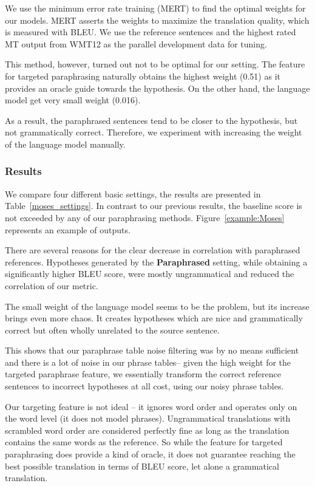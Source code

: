 \documentclass[11pt]{article}
\def\Tref#1{Table~\ref{#1}}
\def\Fref#1{Figure~\ref{#1}}
\begin{document}
We use the minimum error rate training (MERT) \cite{mert} to find the optimal 
weights for our models. MERT asserts the weights to maximize the translation 
quality, which is measured with BLEU. We use the reference sentences and the 
highest rated MT output from WMT12 as the parallel development data for tuning. 

This method, however, turned out not to be optimal for our setting. The feature 
for targeted paraphrasing naturally obtains the highest weight (0.51) as it 
provides an oracle guide towards the hypothesis. On the other hand, the language 
model get very small weight (0.016).

As a result, the paraphrased sentences tend to be closer to the hypothesis, but 
not grammatically correct. Therefore, we experiment with increasing the weight 
of the language model manually. 

\subsubsection{Results}
We compare four different basic settings, the results are presented in 
\Tref{moses_settings}. In contrast to our previous results, the baseline score 
is not exceeded by any of our paraphrasing methods. \Fref{example:Moses} 
represents an example of outputs. 

There are several reasons for the clear decrease in correlation with 
paraphrased references. Hypotheses generated by the \textbf{Paraphrased} 
setting, while obtaining a significantly higher BLEU score, were mostly 
ungrammatical and reduced the correlation of our metric.

The small weight of the language model seems to be the problem, but its 
increase brings even more chaos. It creates hypotheses which are nice and 
grammatically correct but often wholly unrelated to the source sentence.

This shows that our paraphrase table noise filtering was by no means sufficient 
and there is a lot of noise in our phrase tables-- given the high weight for the 
targeted paraphrase feature, we essentially transform the correct reference 
sentences to incorrect hypotheses at all cost, using our noisy phrase tables.

Our targeting feature is not ideal -- it ignores word order and operates
only on the word level (it does not model phrases). Ungrammatical translations
with scrambled word order are considered perfectly fine as long as the
translation contains the same words as the reference. So while the feature 
for targeted paraphrasing does provide a kind of oracle, it does not guarantee 
reaching the best possible translation in terms of BLEU score, let alone a 
grammatical translation.
\end{document}
